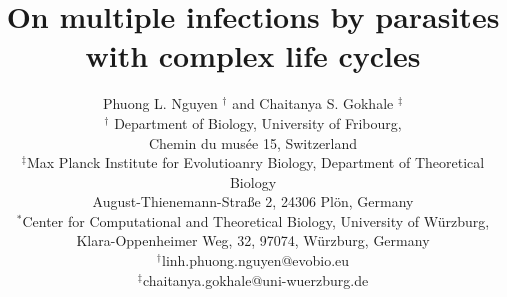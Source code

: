 \documentclass[a4paper]{scrartcl}
\providecommand{\DIFaddtex}[1]{{\protect\color{blue}\uwave{#1}}} %
\providecommand{\DIFdeltex}[1]{{\protect\color{red}\sout{#1}}}                      %
\providecommand{\DIFaddbegin}{} %
\providecommand{\DIFaddend}{} %
\providecommand{\DIFdelbegin}{} %
\providecommand{\DIFdelend}{} %
\providecommand{\DIFadd}[1]{\texorpdfstring{\DIFaddtex{#1}}{#1}} %
\providecommand{\DIFdel}[1]{\texorpdfstring{\DIFdeltex{#1}}{}} %
\newcommand{\DIFscaledelfig}{0.5}
\newlength{\DIFdelgraphicswidth} %
\newlength{\DIFdelgraphicsheight} %
\newcommand{\DIFaddincludegraphics}[2][]{{\color{blue}\fbox{\DIFOincludegraphics[#1]{#2}}}} %
\newcommand{\DIFdelincludegraphics}[2][]{%
\sbox{\DIFdelgraphicsbox}{\DIFOincludegraphics[#1]{#2}}%
\settoboxwidth{\DIFdelgraphicswidth}{\DIFdelgraphicsbox} %
\settoboxtotalheight{\DIFdelgraphicsheight}{\DIFdelgraphicsbox} %
\scalebox{\DIFscaledelfig}{%
\parbox[b]{\DIFdelgraphicswidth}{\usebox{\DIFdelgraphicsbox}\\[-\baselineskip] \rule{\DIFdelgraphicswidth}{0em}}\llap{\resizebox{\DIFdelgraphicswidth}{\DIFdelgraphicsheight}{%
\setlength{\unitlength}{\DIFdelgraphicswidth}%
\begin{picture}(1,1)%
\thicklines\linethickness{2pt} %
{\color[rgb]{1,0,0}\put(0,0){\framebox(1,1){}}}%
{\color[rgb]{1,0,0}\put(0,0){\line( 1,1){1}}}%
{\color[rgb]{1,0,0}\put(0,1){\line(1,-1){1}}}%
\end{picture}%
}\hspace*{3pt}}} %
} %
\DeclareRobustCommand{\DIFaddbegin}{\DIFOaddbegin \let\includegraphics\DIFaddincludegraphics} %
\DeclareRobustCommand{\DIFaddend}{\DIFOaddend \let\includegraphics\DIFOincludegraphics} %
\DeclareRobustCommand{\DIFdelbegin}{\DIFOdelbegin \let\includegraphics\DIFdelincludegraphics} %
\DeclareRobustCommand{\DIFdelend}{\DIFOaddend \let\includegraphics\DIFOincludegraphics} %
\begin{document}
\sffamily
\title{
On multiple infections by parasites with complex life cycles
}   
\author{Phuong L. Nguyen $^{\dag}$ and Chaitanya S. Gokhale \DIFdelbegin \DIFdel{$^{\ddag}$}\DIFdelend \DIFaddbegin \DIFadd{$^{\ddag,\ast}$}\DIFaddend \\
\small{$^\dag$ Department of Biology, University of Fribourg,}\\
\small{Chemin du mus\'{e}e 15, Switzerland}\\
\small{$^\ddag$Max Planck Institute for Evolutioanry Biology, Department of Theoretical Biology}\\
\small{August-Thienemann-Stra{\ss}e 2, 24306 Pl\"{o}n, Germany}\\
\DIFdelbegin %
\DIFdelend \DIFaddbegin \small{$^\ast$Center for Computational and Theoretical Biology, University of W\"{u}rzburg,}\DIFaddend \\
\small{Klara-Oppenheimer Weg, 32, 97074, W\"{u}rzburg, Germany}\\
\small{$^\dag$linh.phuong.nguyen@evobio.eu}\\
\small{$^\ddag$chaitanya.gokhale@uni-wuerzburg.de}
}

\date{}
\maketitle


\linenumbers

\end{document}
